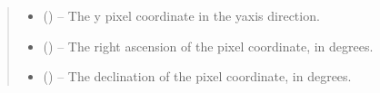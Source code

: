 \documentclass[letterpaper,11pt,english]{sphinxmanual}
\begin{document}
\begin{savenotes}
\begin{fulllineitems}
\begin{savenotes}
\begin{fulllineitems}
\begin{quote}
\begin{description}
\begin{itemize}
\item {} 
\sphinxAtStartPar
{} () – The y pixel coordinate in the y\sphinxhyphen{}axis direction.

\end{itemize}

\sphinxAtStartPar
\begin{itemize}
\item {} 
\sphinxAtStartPar
{} () – The right ascension of the pixel coordinate, in degrees.

\item {} 
\sphinxAtStartPar
{} () – The declination of the pixel coordinate, in degrees.

\end{itemize}


\end{description}\end{quote}

\end{fulllineitems}\end{savenotes}



\end{fulllineitems}
\end{savenotes}
\end{document}
